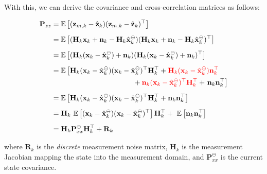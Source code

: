 With this, we can derive the covariance and cross-\/correlation matrices as follows\+:

\begin{align*} \mathbf{P}_{zz} &= \mathbb{E}\left[ (\mathbf{z}_{m,k} - \hat{\mathbf{z}}_k)(\mathbf{z}_{m,k} - \hat{\mathbf{z}}_k)^\top \right] \\[5px] &= \mathbb{E}\left[ (\mathbf{H}_k\mathbf{x}_k + \mathbf{n}_k - \mathbf{H}_k{\hat{\mathbf{x}}_k^\ominus}) (\mathbf{H}_k\mathbf{x}_k + \mathbf{n}_k - \mathbf{H}_k{\hat{\mathbf{x}}_k^\ominus})^\top \right] \\[5px] &= \mathbb{E}\left[ (\mathbf{H}_k(\mathbf{x}_k - {\hat{\mathbf{x}}_k^\ominus}) + \mathbf{n}_k) (\mathbf{H}_k(\mathbf{x}_k - {\hat{\mathbf{x}}_k^\ominus}) + \mathbf{n}_k)^\top \right] \\[5px] &= \mathbb{E}\left[ \mathbf{H}_k(\mathbf{x}_k - {\hat{\mathbf{x}}_k^\ominus}) (\mathbf{x}_k - {\hat{\mathbf{x}}_k^\ominus})^\top\mathbf{H}_k^\top + \textcolor{red}{\mathbf{H}_k(\mathbf{x}_k - {\hat{\mathbf{x}}_k^\ominus}) \mathbf{n}_k^\top} \right.\nonumber\\ &\hspace{4cm}+ \textcolor{red}{\mathbf{n}_k (\mathbf{x}_k - {\hat{\mathbf{x}}_k^\ominus})^\top\mathbf{H}_k^\top} + \left. \mathbf{n}_k \mathbf{n}_k^\top \right] \\[5px] &= \mathbb{E}\left[ \mathbf{H}_k(\mathbf{x}_k - {\hat{\mathbf{x}}_k^\ominus}) (\mathbf{x}_k - {\hat{\mathbf{x}}_k^\ominus})^\top\mathbf{H}_k^\top + \mathbf{n}_k \mathbf{n}_k^\top \right] \\[5px] &= \mathbf{H}_k~\mathbb{E}\left[(\mathbf{x}_k - {\hat{\mathbf{x}}_k^\ominus}) (\mathbf{x}_k - {\hat{\mathbf{x}}_k^\ominus})^\top\right]\mathbf{H}_k^\top + ~\mathbb{E}\left[\mathbf{n}_k\mathbf{n}_k^\top\right] \\[5px] &= \mathbf{H}_k\mathbf{P}_{xx}^\ominus\mathbf{H}_k^\top + \mathbf{R}_k \end{align*}

where $\mathbf{R}_k$ is the {\itshape discrete} measurement noise matrix, $\mathbf{H}_k$ is the measurement Jacobian mapping the state into the measurement domain, and $\mathbf{P}_{xx}^\ominus$ is the current state covariance.

